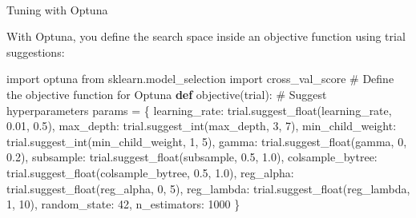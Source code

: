 \documentclass[
  letterpaper,
  DIV=11,
  numbers=noendperiod]{scrreprt}
\makeatletter
\let\oldparagraph\paragraph
\renewcommand{\paragraph}{
    \@ifstar
      \xxxParagraphStar
      \xxxParagraphNoStar
  }
\newcommand{\xxxParagraphStar}[1]{\oldparagraph*{#1}\mbox{}}
\newcommand{\xxxParagraphNoStar}[1]{\oldparagraph{#1}\mbox{}}
\newenvironment{Shaded}{\begin{snugshade}}{\end{snugshade}}
\newcommand{\CommentTok}[1]{\textcolor[rgb]{0.37,0.37,0.37}{#1}}
\newcommand{\DecValTok}[1]{\textcolor[rgb]{0.68,0.00,0.00}{#1}}
\newcommand{\FloatTok}[1]{\textcolor[rgb]{0.68,0.00,0.00}{#1}}
\newcommand{\ImportTok}[1]{\textcolor[rgb]{0.00,0.46,0.62}{#1}}
\newcommand{\KeywordTok}[1]{\textcolor[rgb]{0.00,0.23,0.31}{\textbf{#1}}}
\newcommand{\NormalTok}[1]{\textcolor[rgb]{0.00,0.23,0.31}{#1}}
\newcommand{\OperatorTok}[1]{\textcolor[rgb]{0.37,0.37,0.37}{#1}}
\newcommand{\StringTok}[1]{\textcolor[rgb]{0.13,0.47,0.30}{#1}}
\makeatother
\begin{document}
\paragraph{Tuning with Optuna}\label{tuning-with-optuna}

With Optuna, you define the search space inside an objective function
using trial suggestions:

\begin{Shaded}
\begin{Highlighting}[]
\ImportTok{import}\NormalTok{ optuna}
\ImportTok{from}\NormalTok{ sklearn.model\_selection }\ImportTok{import}\NormalTok{ cross\_val\_score}
\CommentTok{\# Define the objective function for Optuna}
\KeywordTok{def}\NormalTok{ objective(trial):}
    \CommentTok{\# Suggest hyperparameters}
\NormalTok{    params }\OperatorTok{=}\NormalTok{ \{}
        \StringTok{\textquotesingle{}learning\_rate\textquotesingle{}}\NormalTok{: trial.suggest\_float(}\StringTok{\textquotesingle{}learning\_rate\textquotesingle{}}\NormalTok{, }\FloatTok{0.01}\NormalTok{, }\FloatTok{0.5}\NormalTok{),}
        \StringTok{\textquotesingle{}max\_depth\textquotesingle{}}\NormalTok{: trial.suggest\_int(}\StringTok{\textquotesingle{}max\_depth\textquotesingle{}}\NormalTok{, }\DecValTok{3}\NormalTok{, }\DecValTok{7}\NormalTok{),}
        \StringTok{\textquotesingle{}min\_child\_weight\textquotesingle{}}\NormalTok{: trial.suggest\_int(}\StringTok{\textquotesingle{}min\_child\_weight\textquotesingle{}}\NormalTok{, }\DecValTok{1}\NormalTok{, }\DecValTok{5}\NormalTok{),}
        \StringTok{\textquotesingle{}gamma\textquotesingle{}}\NormalTok{: trial.suggest\_float(}\StringTok{\textquotesingle{}gamma\textquotesingle{}}\NormalTok{, }\DecValTok{0}\NormalTok{, }\FloatTok{0.2}\NormalTok{),}
        \StringTok{\textquotesingle{}subsample\textquotesingle{}}\NormalTok{: trial.suggest\_float(}\StringTok{\textquotesingle{}subsample\textquotesingle{}}\NormalTok{, }\FloatTok{0.5}\NormalTok{, }\FloatTok{1.0}\NormalTok{),}
        \StringTok{\textquotesingle{}colsample\_bytree\textquotesingle{}}\NormalTok{: trial.suggest\_float(}\StringTok{\textquotesingle{}colsample\_bytree\textquotesingle{}}\NormalTok{, }\FloatTok{0.5}\NormalTok{, }\FloatTok{1.0}\NormalTok{),}
        \StringTok{\textquotesingle{}reg\_alpha\textquotesingle{}}\NormalTok{: trial.suggest\_float(}\StringTok{\textquotesingle{}reg\_alpha\textquotesingle{}}\NormalTok{, }\DecValTok{0}\NormalTok{, }\DecValTok{5}\NormalTok{),}
        \StringTok{\textquotesingle{}reg\_lambda\textquotesingle{}}\NormalTok{: trial.suggest\_float(}\StringTok{\textquotesingle{}reg\_lambda\textquotesingle{}}\NormalTok{, }\DecValTok{1}\NormalTok{, }\DecValTok{10}\NormalTok{),}
        \StringTok{\textquotesingle{}random\_state\textquotesingle{}}\NormalTok{: }\DecValTok{42}\NormalTok{,}
        \StringTok{\textquotesingle{}n\_estimators\textquotesingle{}}\NormalTok{: }\DecValTok{1000}
\NormalTok{    \}}


\end{Highlighting}
\end{Shaded}
\end{document}
